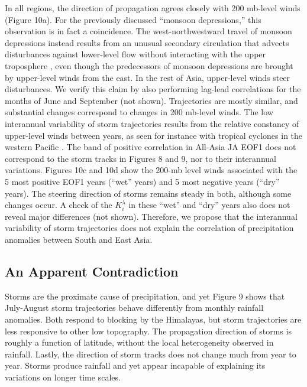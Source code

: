 	 In all regions, the direction of propagation agrees closely with 200 mb-level winds (Figure 10a). For the previously discussed ``monsoon depressions,'' this observation is in fact a coincidence. The west-northwestward travel of monsoon depressions instead results from an unusual secondary circulation that advects disturbances against lower-level flow without interacting with the upper troposphere \citep{Chen2000,Chen2005}, even though the predecessors of monsoon depressions are brought by upper-level winds from the east. In the rest of Asia, upper-level winds steer disturbances. We verify this claim by also performing lag-lead correlations for the months of June and September (not shown). Trajectories are mostly similar, and substantial changes correspond to changes in 200 mb-level winds. The low interannual variability of storm trajectories results from the relative constancy of upper-level winds between years, as seen for instance with tropical cyclones in the western Pacific \citep{Kumar2005}. The band of positive correlation in All-Asia JA EOF1 does not correspond to the storm tracks in Figures 8 and 9, nor to their interannual variations. Figures 10c and 10d show the 200-mb level winds associated with the 5 most positive EOF1 years (``wet'' years) and 5 most negative years (``dry'' years). The steering direction of storms remains steady in both, although some changes occur. A check of the $K_i^\lambda$ in these ``wet'' and ``dry'' years also does not reveal major differences (not shown). Therefore, we propose that the interannual variability of storm trajectories does not explain the correlation of precipitation anomalies between South and East Asia.
	 
\subsection{An Apparent Contradiction}
	 
	 Storms are the proximate cause of precipitation, and yet Figure 9 shows that July-August storm trajectories behave differently from monthly rainfall anomalies. Both respond to blocking by the Himalayas, but storm trajectories are less responsive to other low topography. The propagation direction of storms is roughly a function of latitude, without the local heterogeneity observed in rainfall. Lastly, the direction of storm tracks does not change much from year to year. Storms produce rainfall and yet appear incapable of explaining its variations on longer time scales.
	 
